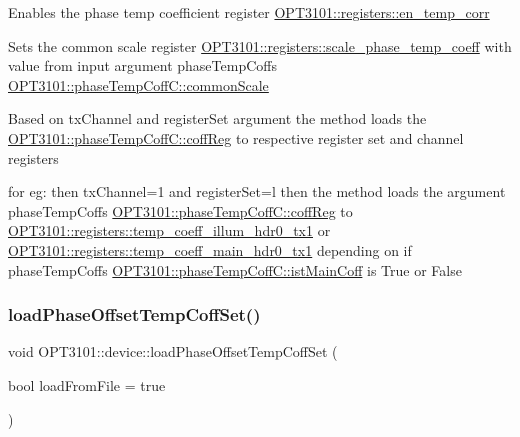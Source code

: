 \begin{DoxyItemize}
\item Enables the phase temp coefficient register \mbox{\hyperlink{class_o_p_t3101_1_1registers_aa14680f50f347cb771067cd833720963}{O\+P\+T3101\+::registers\+::en\+\_\+temp\+\_\+corr}}
\item Sets the common scale register \mbox{\hyperlink{class_o_p_t3101_1_1registers_a0e1ab2b8fda7b67d1d83606b2a5af70f}{O\+P\+T3101\+::registers\+::scale\+\_\+phase\+\_\+temp\+\_\+coeff}} with value from input argument phase\+Temp\+Coff\textquotesingle{}s \mbox{\hyperlink{class_o_p_t3101_1_1phase_temp_coff_c_a0f7646d71d058bc5354ac8f14270fcf3}{O\+P\+T3101\+::phase\+Temp\+Coff\+C\+::common\+Scale}}
\item Based on tx\+Channel and register\+Set argument the method loads the \mbox{\hyperlink{class_o_p_t3101_1_1phase_temp_coff_c_a69e1782e097ce7ab761e4e55b5206f2e}{O\+P\+T3101\+::phase\+Temp\+Coff\+C\+::coff\+Reg}} to respective register set and channel registers ~\newline

\item for eg\+: then tx\+Channel=1 and register\+Set=\textquotesingle{}l\textquotesingle{} then the method loads the argument phase\+Temp\+Coff\textquotesingle{}s \mbox{\hyperlink{class_o_p_t3101_1_1phase_temp_coff_c_a69e1782e097ce7ab761e4e55b5206f2e}{O\+P\+T3101\+::phase\+Temp\+Coff\+C\+::coff\+Reg}} to \mbox{\hyperlink{class_o_p_t3101_1_1registers_aa8aaf83fcdf6038175fa7e43458b86b6}{O\+P\+T3101\+::registers\+::temp\+\_\+coeff\+\_\+illum\+\_\+hdr0\+\_\+tx1}} or \mbox{\hyperlink{class_o_p_t3101_1_1registers_a0ce99967b663007766113d06d946b28f}{O\+P\+T3101\+::registers\+::temp\+\_\+coeff\+\_\+main\+\_\+hdr0\+\_\+tx1}} depending on if phase\+Temp\+Coff\textquotesingle{}s \mbox{\hyperlink{class_o_p_t3101_1_1phase_temp_coff_c_abcd691cfc4678e3588bc1b38600632e7}{O\+P\+T3101\+::phase\+Temp\+Coff\+C\+::ist\+Main\+Coff}} is True or False 
\end{DoxyItemize}\mbox{\label{class_o_p_t3101_1_1device_a69d7fbb471d186845242774d7f2c86a8}} 
\subsubsection{\texorpdfstring{load\+Phase\+Offset\+Temp\+Coff\+Set()}{loadPhaseOffsetTempCoffSet()}}
{\footnotesize\ttfamily void O\+P\+T3101\+::device\+::load\+Phase\+Offset\+Temp\+Coff\+Set (\begin{DoxyParamCaption}\item[{bool}]{load\+From\+File = {\ttfamily true} }\end{DoxyParamCaption})}



